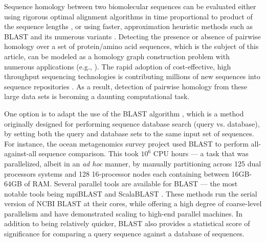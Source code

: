 \documentclass[10pt,journal,letterpaper,compsoc]{IEEEtran}
\begin{document}
Sequence homology between two biomolecular sequences can be evaluated either using rigorous optimal alignment algorithms in time proportional to product of the sequence lengths \cite{Needleman70,Smith81}, or using faster, approximation heuristic methods such as BLAST and its numerous variants \cite{Altschul90}. Detecting the presence or absence of pairwise homology over a set of protein/amino acid sequences, which is the subject of this article, can be modeled as a homology graph construction problem with numerous applications (e.g., \cite{Apweiler04,Bateman04,Enright02,Kriventseva01,Olman07}). The rapid adoption of cost-effective, high throughput sequencing technologies is contributing  millions of new sequences  into sequence repositories \cite{CAMERA,NCBI}. As a result, detection of pairwise homology from these large data sets is becoming a daunting computational task. 

One option is to adapt the use of the BLAST algorithm \cite{Altschul90}, which is a method originally designed for performing sequence database search (query vs. database), by setting both the query and database sets to the same input set of sequences. For instance, the ocean metagenomics survey project \cite{Yooseph07} used BLAST to perform all-against-all sequence comparison. This took $10^6$ CPU hours --- a task that was parallelized, albeit in an {\it ad hoc} manner, by manually partitioning across 125 dual processors systems and 128 16-processor nodes each containing between 16GB-64GB of RAM. Several parallel tools are available for BLAST --- the most notable tools being mpiBLAST \cite{Darling03} and ScalaBLAST \cite{Oehmen06}. These methods run the serial version of NCBI BLAST at their cores, while offering a high degree of coarse-level parallelism and have demonstrated scaling  to high-end parallel machines. In addition to being relatively quicker, BLAST also provides a statistical score of significance for comparing a query sequence against a database of sequences. 
\end{document}
